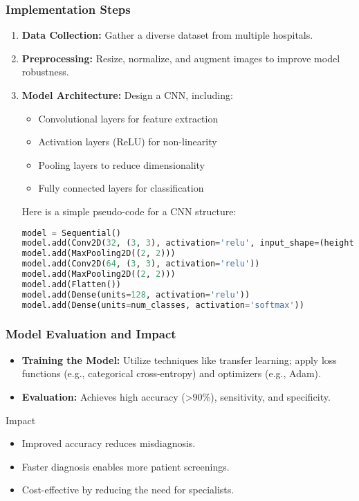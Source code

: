 \documentclass[aspectratio=169]{beamer}
\begin{document}
\begin{frame}[fragile]
    \frametitle{Implementation Steps}
    \begin{enumerate}
        \item \textbf{Data Collection:} Gather a diverse dataset from multiple hospitals.
        \item \textbf{Preprocessing:} Resize, normalize, and augment images to improve model robustness.
        \item \textbf{Model Architecture:} Design a CNN, including:
            \begin{itemize}
                \item Convolutional layers for feature extraction
                \item Activation layers (ReLU) for non-linearity
                \item Pooling layers to reduce dimensionality
                \item Fully connected layers for classification
            \end{itemize}
            Here is a simple pseudo-code for a CNN structure:
            \begin{lstlisting}[language=Python]
model = Sequential()
model.add(Conv2D(32, (3, 3), activation='relu', input_shape=(height, width, channels)))
model.add(MaxPooling2D((2, 2)))
model.add(Conv2D(64, (3, 3), activation='relu'))
model.add(MaxPooling2D((2, 2)))
model.add(Flatten())
model.add(Dense(units=128, activation='relu'))
model.add(Dense(units=num_classes, activation='softmax'))
            \end{lstlisting}
    \end{enumerate}
\end{frame}

\begin{frame}
    \frametitle{Model Evaluation and Impact}
    \begin{itemize}
        \item \textbf{Training the Model:} Utilize techniques like transfer learning; apply loss functions (e.g., categorical cross-entropy) and optimizers (e.g., Adam).
        \item \textbf{Evaluation:} Achieves high accuracy (>90\%), sensitivity, and specificity.
    \end{itemize}
    
    \begin{block}{Impact}
        \begin{itemize}
            \item Improved accuracy reduces misdiagnosis.
            \item Faster diagnosis enables more patient screenings.
            \item Cost-effective by reducing the need for specialists.
        \end{itemize}
    \end{block}
\end{frame}
\end{document}
